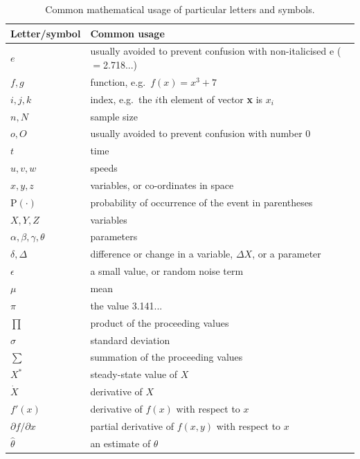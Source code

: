 \documentclass[12pt]{article}
\begin{document}
\begin{table}
  \caption{Common mathematical usage of particular letters and
      symbols. \label{tab:letters}}
  \centering
  \begin{tabular}{ll}
\hline
Letter/symbol & Common usage\\
\hline
$e$ & usually avoided to prevent confusion with non-italicised e ($=$2.718...)\\
$f, g$ & function, e.g.~$f(x) = x^3 + 7$\\
$i, j, k$ & index, e.g.~the $i$th element of vector {\bf x} is $x_i$\\
$n, N$ & sample size\\
$o, O$ & usually avoided to prevent confusion with number 0\\
$t$ & time\\
$u, v, w$ & speeds\\    
$x, y, z$ & variables, or co-ordinates in space\\
\mbox{P}$(\cdot)$ & probability of occurrence of the event in parentheses\\
$X, Y, Z$ & variables\\
$\alpha, \beta, \gamma, \theta$ & parameters\\
$\delta, \Delta$ & difference or change in a variable, $\Delta X$, or a 
  parameter\\ 
$\epsilon$ & a small value, or random noise term\\
$\mu$ & mean\\
$\pi$ & the value 3.141...\\
$\prod$ & product of the proceeding values\\
$\sigma$ & standard deviation\\
$\sum$ & summation of the proceeding values\\
$X^*$ & steady-state value of $X$\\
$\dot{X}$ & derivative of $X$\\  %
$f'(x)$ & derivative of $f(x)$ with respect to $x$\\
$\partial f/\partial x$ & partial derivative of $f(x,y)$ with respect to $x$\\
$\hat{\theta}$ & an estimate of $\theta$\\
\hline
\end{tabular}
\end{table}

\end{document}
